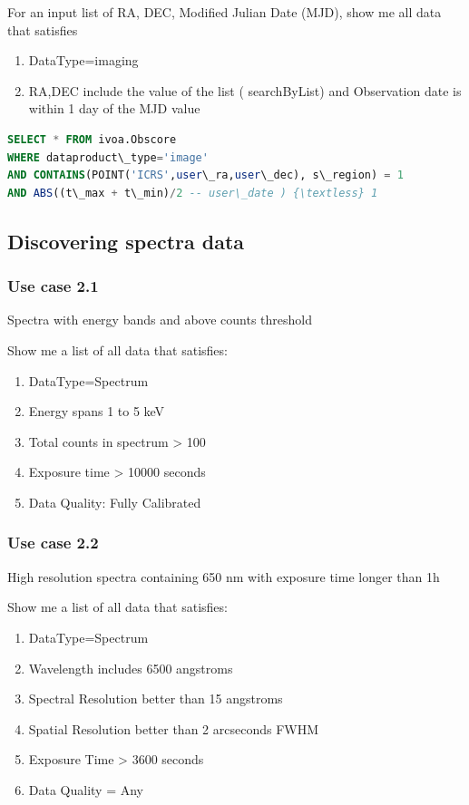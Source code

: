 \documentclass[11pt,a4paper]{ivoa}
\begin{document}
For an input list of RA, DEC, Modified Julian Date (MJD), show me all data that satisfies

\begin{enumerate}
\item DataType=imaging
\item RA,DEC include the value of  the list ( searchByList) and Observation date is within 1 day of the MJD value
\end{enumerate}

\begin{lstlisting}[language=SQL,flexiblecolumns=true]
SELECT * FROM ivoa.Obscore
WHERE dataproduct\_type='image'
AND CONTAINS(POINT('ICRS',user\_ra,user\_dec), s\_region) = 1
AND ABS((t\_max + t\_min)/2 -- user\_date ) {\textless} 1
\end{lstlisting}


\subsection{Discovering spectra data}

\subsubsection{Use case 2.1}
Spectra with energy bands and above counts threshold

Show me a list of all data that satisfies:

\begin{enumerate}
\item DataType=Spectrum
\item Energy spans 1 to 5 keV
\item Total counts in spectrum {\textgreater} 100
\item Exposure time {\textgreater} 10000 seconds
\item Data Quality: Fully Calibrated
\end{enumerate}
\subsubsection{Use case 2.2}
High resolution spectra containing 650 nm with exposure time longer than 1h

Show me a list of all data that satisfies:

\begin{enumerate}
\item DataType=Spectrum
\item Wavelength includes 6500 angstroms
\item Spectral Resolution better than 15 angstroms
\item Spatial Resolution better than 2 arcseconds FWHM
\item Exposure Time {\textgreater} 3600 seconds
\item Data Quality = Any
\end{enumerate}
\end{document}
